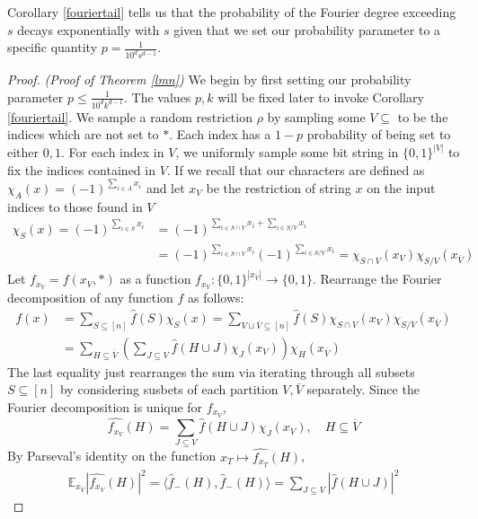 \documentclass{amsart}
\theoremstyle{definition}
\theoremstyle{remark}
\numberwithin{equation}{section}
\theoremstyle{remark}
\begin{document}
%
\noindent Corollary \ref{fouriertail} tells us that the probability of the Fourier degree exceeding $s$ decays exponentially with $s$ given that we set our probability parameter to a specific quantity $p = \frac{1}{10^ds^{d-1}}$.
%
\begin{proof}{\emph{(Proof of Theorem \ref{lmn})}}
We begin by first setting our probability parameter $p \leq \frac{1}{10^dk^{d-1}}$. The values $p, k$ will be fixed later to invoke Corollary \ref{fouriertail}.
We sample a random restriction $\rho$ by sampling some $V \subseteq$ to be the indices which are not set to $*$. Each index has a $1-p$ probability of being set to either $0,1$. For each index in $V$, we uniformly sample some bit string in $\{0,1\}^{|V|}$ to fix the indices contained in $V$. If we recall that our characters are defined as $\chi_A(x) = (-1)^{\sum_{i \in A} x_i}$ and let $x_{V}$ be the restriction of string $x$ on the input indices to those found in $V$ \newline
%
\begin{align}
  \chi_S(x) = (-1)^{\sum_{i \in S} x_i}
  & = (-1)^{\sum_{i \in S \cap V} x_i + \sum_{i \in S / V} x_i}   \\
  & = (-1)^{\sum_{i \in S \cap V} x_i}(-1)^{\sum_{i \in S / V} x_i} = \chi_{S \cap V}(x_V) \chi_{S / V}(x_{\overline{V}})
\end{align}
%
Let $f_{x_V} = f(x_V,*)$ as a function $f_{x_V}: \{0,1\}^{|x_{\overline{V}}|} \rightarrow \{0,1\}$.
Rearrange the Fourier decomposition of any function $f$ as follows:
%
\begin{align}
f(x)
& = \sum_{S \subseteq [n]} \hat{f}(S)\chi_{S}(x) =  \sum_{V \sqcup \overline{V} \subseteq [n]} \hat{f}(S)\chi_{S \cap V}(x_V)\chi_{S / V}({x_{\overline{V}}}) \\
& = \sum_{H \subseteq \overline{V}} \left( \sum_{J \subseteq V} \hat{f}(H \cup J) \chi_{J}(x_V) \right) \chi_H(x_{\overline{V}})
\end{align}
%
The last equality just rearranges the sum via iterating through all subsets $S \subseteq [n]$ by considering susbets of each partition $V, \overline{V}$ separately. Since the Fourier decomposition is unique for $f_{x_V}$,
\begin{equation}
  \widehat{f_{x_V}}(H) = \sum_{J \subseteq V} \hat{f}(H \cup J)\chi_{J}(x_V), \quad H \subseteq \overline{V}
\end{equation}
By Parseval's identity on the function $x_T \mapsto \widehat{f_{x_T}}(H)$,
\begin{align}
  \mathbb{E}_{x_V}|\widehat{f_{x_V}}(H)|^2 = \langle \hat{f}_{-}(H), \hat{f}_{-}(H) \rangle = \sum_{J \subseteq V} |\hat{f}(H \cup J)|^2

\end{align}
\end{proof}
\end{document}
